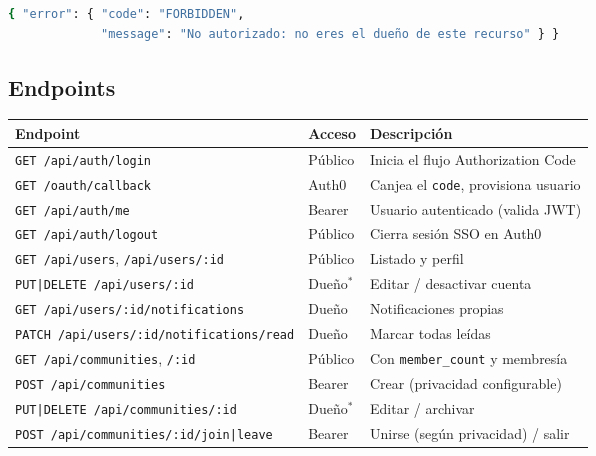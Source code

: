 \documentclass{article}
\begin{document}
\begin{lstlisting}[language=bash,caption={Shape de error consistente}]
{ "error": { "code": "FORBIDDEN",
             "message": "No autorizado: no eres el dueño de este recurso" } }
\end{lstlisting}

\subsection{Endpoints}

\begin{table}[H]
\setlength{\tabcolsep}{0.35em}
{\renewcommand{\arraystretch}{1.22}
\footnotesize
\begin{tabular}{|p{6.9cm}|p{2.1cm}|p{5.4cm}|}
    \hline
    \rowcolor{tablebackground}
    \color{white}\textbf{Endpoint} & \color{white}\textbf{Acceso} & \color{white}\textbf{Descripción} \\
    \hline
    \texttt{GET /api/auth/login} & Público & Inicia el flujo Authorization Code \\
    \hline
    \texttt{GET /oauth/callback} & Auth0 & Canjea el \texttt{code}, provisiona usuario \\
    \hline
    \texttt{GET /api/auth/me} & Bearer & Usuario autenticado (valida JWT) \\
    \hline
    \texttt{GET /api/auth/logout} & Público & Cierra sesión SSO en Auth0 \\
    \hline
    \texttt{GET /api/users}, \texttt{/api/users/:id} & Público & Listado y perfil \\
    \hline
    \texttt{PUT|DELETE /api/users/:id} & Dueño$^{*}$ & Editar / desactivar cuenta \\
    \hline
    \texttt{GET /api/users/:id/notifications} & Dueño & Notificaciones propias \\
    \hline
    \texttt{PATCH /api/users/:id/notifications/read} & Dueño & Marcar todas leídas \\
    \hline
    \texttt{GET /api/communities}, \texttt{/:id} & Público & Con \texttt{member\_count} y membresía \\
    \hline
    \texttt{POST /api/communities} & Bearer & Crear (privacidad configurable) \\
    \hline
    \texttt{PUT|DELETE /api/communities/:id} & Dueño$^{*}$ & Editar / archivar \\
    \hline
    \texttt{POST /api/communities/:id/join|leave} & Bearer & Unirse (según privacidad) / salir \\
    \hline

\end{tabular}}
\end{table}
\end{document}
